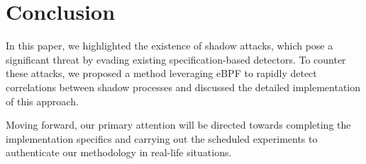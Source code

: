 \section{Conclusion}
In this paper, we highlighted the existence of shadow attacks,
which pose a significant threat by evading existing specification-based detectors.
To counter these attacks, we proposed a method leveraging eBPF to rapidly detect correlations
between shadow processes and discussed the detailed implementation of this approach.

Moving forward, our primary attention will be directed towards completing
the implementation specifics and carrying out the scheduled experiments to authenticate
our methodology in real-life situations.




